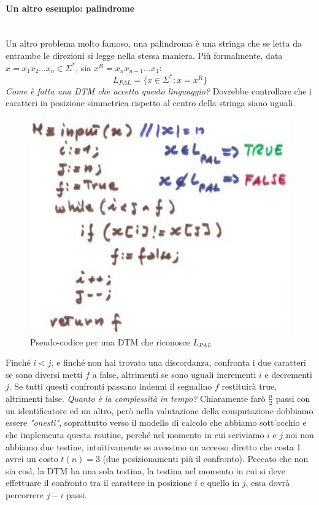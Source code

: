 \documentclass{article}
\begin{document}
\paragraph{Un altro esempio: palindrome}\mbox{}\\
Un altro problema molto famoso, una palindroma è una stringa che se letta
da entrambe le direzioni si legge nella stessa maniera. Più formalmente,
data $x=x_1 x_2\dots x_n\in\Sigma^*$, sia $x^R=x_n x_{n-1}\dots x_1$:
$$L_{PAL}=\{x\in\Sigma^*:x=x^R\}$$
\textit{Come è fatta una DTM che accetta questo linguaggio?} Dovrebbe
controllare che i caratteri in posizione simmetrica rispetto al centro
della stringa siano uguali.
\begin{figure}[H]
    \centering
    \includegraphics[scale=0.5]{images/DTM_pal.png}
    \caption{Pseudo-codice per una DTM che riconosce $L_{PAL}$}
\end{figure}
Finché $i<j$, e finché non hai trovato una discordanza, confronta i due caratteri
se sono diversi metti $f$ a false, altrimenti se sono uguali incrementi $i$ e decrementi
$j$. Se tutti questi confronti passano indenni il segnalino $f$ restituirà true,
altrimenti false. \textit{Quanto è la complessità in tempo?} Chiaramente
farò $\frac{n}{2}$ passi con un identificatore ed un altro, però nella valutazione
della computazione dobbiamo essere \textit{"onesti"}, soprattutto verso il
modello di calcolo che abbiamo sott'occhio e che implementa questa routine, perché
nel momento in cui scriviamo $i$ e $j$ noi non abbiamo due testine, intuitivamente
se avessimo un accesso diretto che costa 1 avrei un costo $t(n)=3$ (due
posizionamenti più il confronto). Peccato che non sia così, la DTM ha una
sola testina, la testina nel momento in cui si deve effettuare il confronto
tra il carattere in posizione $i$ e quello in $j$, essa dovrà percorrere
$j-i$ passi.
\end{document}
